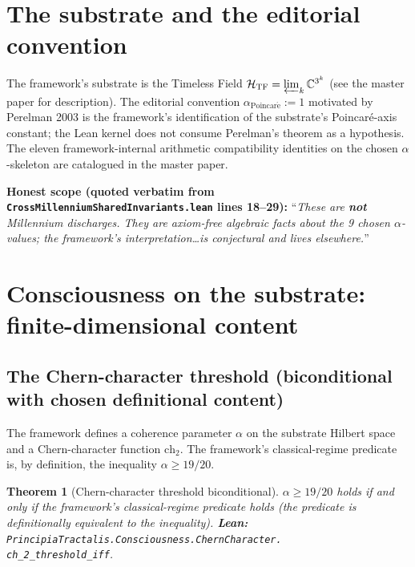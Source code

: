 \documentclass[11pt,a4paper]{article}
\theoremstyle{plain}
\newtheorem{theorem}{Theorem}[section]
\theoremstyle{definition}
\begin{document}
\section{The substrate and the editorial convention}
\label{sec:substrate-and-convention}

The framework's substrate is the Timeless Field
$\mathcal{H}_{\mathrm{TF}} = \varprojlim_{k} \mathbb{C}^{3^{k}}$ (see
the master paper \cite{master_substrate} for description). The
editorial convention $\alpha_{\mathrm{Poincar\acute e}} := 1$
motivated by Perelman 2003 \cite{perelman2002,perelman2003a,%
perelman2003b} is the framework's identification of the substrate's
Poincar\'e-axis constant; the Lean kernel does not consume Perelman's
theorem as a hypothesis. The eleven framework-internal arithmetic
compatibility identities on the chosen $\alpha$-skeleton are
catalogued in the master paper.

\noindent\textbf{Honest scope (quoted verbatim from
\texttt{CrossMillenniumSharedInvariants.lean} lines 18--29):}
``\emph{These are \textbf{not} Millennium discharges. They are
axiom-free algebraic facts about the 9 chosen $\alpha$-values; the
framework's interpretation\ldots is conjectural and lives
elsewhere.}''

\section{Consciousness on the substrate: finite-dimensional content}
\label{sec:consciousness}

\subsection{The Chern-character threshold (biconditional with chosen
definitional content)}
\label{sec:chern-threshold}

The framework defines a coherence parameter $\alpha$ on the
substrate Hilbert space and a Chern-character function $\mathrm{ch}_{2}$.
The framework's classical-regime predicate is, by definition, the
inequality $\alpha \ge 19/20$.

\begin{theorem}[Chern-character threshold biconditional]
\label{thm:ch2-threshold}
$\alpha \ge 19/20$ holds if and only if the framework's
classical-regime predicate holds (the predicate is definitionally
equivalent to the inequality).
\textbf{Lean:}
\texttt{PrincipiaTractalis.Consciousness.ChernCharacter.\\
ch\_2\_threshold\_iff}.
\end{theorem}
\end{document}
